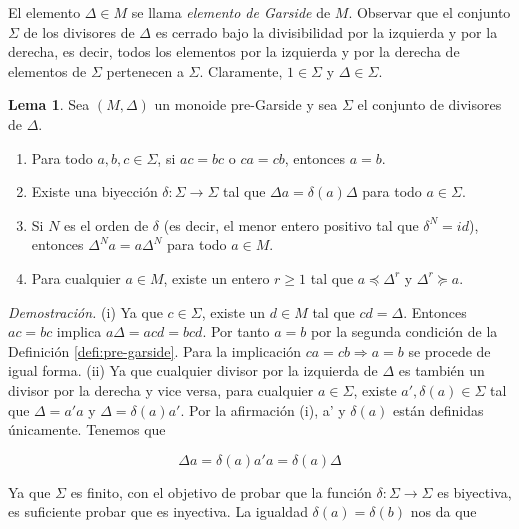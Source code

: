 \documentclass[12pt]{article}
\theoremstyle{definition}
\newtheorem{lema}{Lema}[section]
\begin{document}
El elemento $\Delta\in M$ se llama \textit{elemento de Garside} de $M$. Observar que el conjunto $\Sigma$ de los divisores de $\Delta$ es cerrado bajo la divisibilidad por la izquierda y por la derecha, es decir, todos los elementos por la izquierda y por la derecha de elementos de $\Sigma$ pertenecen a $\Sigma$. Claramente, $1\in\Sigma$ y $\Delta\in\Sigma$.

\begin{lema}
Sea $(M,\Delta)$ un monoide pre-Garside y sea $\Sigma$ el conjunto de divisores de $\Delta$.

\begin{enumerate}[label=(\roman*).]
\item Para todo $a,b,c\in\Sigma$, si $ac=bc$ o $ca=cb$, entonces $a=b$.
\item Existe una biyección $\delta:\Sigma\rightarrow \Sigma$ tal que $\Delta a=\delta(a)\Delta$ para todo $a\in\Sigma$.
\item Si $N$ es el orden de $\delta$ (es decir, el menor entero positivo tal que $\delta^{N}=id$), entonces $\Delta^N a=a\Delta^N$ para todo $a\in M$.
\item Para cualquier $a\in M$, existe un entero $r\geq 1$ tal que $a\preceq\Delta^r$ y $\Delta^r\succeq a$.
\end{enumerate}
\label{lema:pre-garside}
\end{lema}

\textit{Demostración.} (i) Ya que $c\in\Sigma$, existe un $d\in M$ tal que $cd=\Delta$. Entonces $ac=bc$ implica $a\Delta = acd=bcd$. Por tanto $a=b$ por la segunda condición de la Definición \ref{defi:pre-garside}. Para la implicación $ca=cb\Rightarrow a=b$ se procede de igual forma.
\newline
\newline
(ii) Ya que cualquier divisor por la izquierda de $\Delta$ es también un divisor por la derecha y vice versa, para cualquier $a\in\Sigma$, existe $a',\delta(a)\in\Sigma$ tal que $\Delta =a'a$ y $\Delta = \delta(a)a'$. Por la afirmación (i), a' y $\delta(a)$ están definidas únicamente. Tenemos que

\begin{equation}
\Delta a=\delta(a)a'a=\delta(a)\Delta
\label{eq:deltas}
\end{equation}

Ya que $\Sigma$ es finito, con el objetivo de probar que la función $\delta:\Sigma\rightarrow\Sigma$ es biyectiva, es suficiente probar que es inyectiva. La igualdad $\delta(a)=\delta(b)$ nos da que
\end{document}
